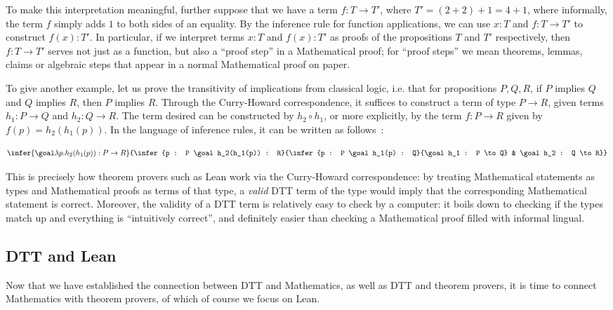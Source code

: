 To make this interpretation meaningful, further suppose that we have a term \(f : T \to T'\), where \(T' = (2 + 2) + 1 = 4 + 1\), where informally, the term \(f\) simply adds \(1\) to both sides of an equality. By the inference rule for function applications, we can use \(x : T\) and \(f : T \to T'\) to construct \(f(x) : T'\). In particular, if we interpret terms \(x : T\) and \(f(x) : T'\) as proofs of the propositions \(T\) and \(T'\) respectively, then \(f : T \to T'\) serves not just as a function, but also a ``proof step'' in a Mathematical proof; for ``proof steps'' we mean theorems, lemmas, claims or algebraic steps that appear in a normal Mathematical proof on paper.

To give another example, let us prove the transitivity of implications from classical logic, i.e. that for propositions \(P, Q, R\), if \(P\) implies \(Q\) and \(Q\) implies \(R\), then \(P\) implies \(R\). Through the Curry-Howard correspondence, it suffices to construct a term of type \(P \to R\), given terms \(h_1 : P \to Q\) and \(h_2 : Q \to R\). The term desired can be constructed by \(h_2 \circ h_1\), or more explicitly, by the term \(f : P \to R\) given by \(f(p) = h_2(h_1(p))\). In the language of inference rules, it can be written as follows~\label{ch-tree}:

\[
  \infer{\goal \lambda p. h_2(h_1(p)) : P \to R}{\infer{p : P \goal h_2(h_1(p)) : R}{\infer{p : P \goal h_1(p) : Q}{\goal h_1 : P \to Q} & \goal h_2 : Q \to R}}
\]

This is precisely how theorem provers such as Lean work via the Curry-Howard correspondence: by treating Mathematical statements as types and Mathematical proofs as terms of that type, a \textit{valid} DTT term of the type would imply that the corresponding Mathematical statement is correct. Moreover, the validity of a DTT term is relatively easy to check by a computer: it boils down to checking if the types match up and everything is ``intuitively correct'', and definitely easier than checking a Mathematical proof filled with informal lingual.

\subsection{DTT and Lean}

Now that we have established the connection between DTT and Mathematics, as well as DTT and theorem provers, it is time to connect Mathematics with theorem provers, of which of course we focus on Lean.

